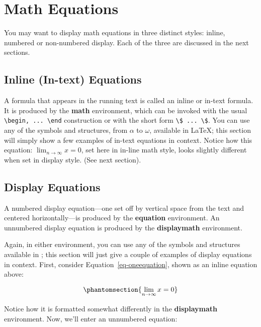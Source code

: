\section{Math Equations}\label{math-equations}

You may want to display math equations in three distinct styles: inline,
numbered or non-numbered display. Each of the three are discussed in the
next sections.

\subsection{Inline (In-text) Equations}\label{inline-in-text-equations}

A formula that appears in the running text is called an inline or
in-text formula. It is produced by the \textbf{math} environment, which
can be invoked with the usual
\texttt{\textbackslash{}begin,\ ...\ \textbackslash{}end} construction
or with the short form
\texttt{\textbackslash{}\$\ ...\ \textbackslash{}\$}. You can use any of
the symbols and structures, from \(\alpha\) to \(\omega\), available in
\LaTeX\citep{Lamport:LaTeX}; this section will simply show a few
examples of in-text equations in context. Notice how this equation:
\(\lim_{n\rightarrow \infty}x=0\), set here in in-line math style, looks
slightly different when set in display style. (See next section).

\subsection{Display Equations}\label{display-equations}

A numbered display equation---one set off by vertical space from the
text and centered horizontally---is produced by the \textbf{equation}
environment. An unnumbered display equation is produced by the
\textbf{displaymath} environment.

Again, in either environment, you can use any of the symbols and
structures available in \LaTeX@; this section will just give a couple of
examples of display equations in context. First, consider
Equation~\ref{eq-oneequation}, shown as an inline equation above:

\begin{equation}\phantomsection{
\lim_{n\rightarrow \infty}x=0
}\label{eq-oneequation}\end{equation}

Notice how it is formatted somewhat differently in the
\textbf{displaymath} environment. Now, we'll enter an unnumbered
equation:

